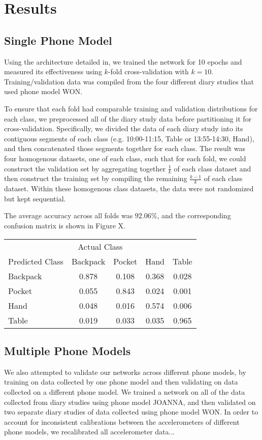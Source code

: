 \section{Results}
\subsection{Single Phone Model}
Using the architecture detailed in, we trained the network for 10 epochs
and measured its effectiveness using $k$-fold cross-validation with $k = 10$.
Training/validation data was compiled from the four different diary studies
that used phone model WON.

To ensure that each fold had comparable training and validation distributions 
for each class, we preprocessed all of the diary study data before partitioning it
for cross-validation. Specifically, we divided the data of each diary study into its 
contiguous segments of each class (e.g. 10:00-11:15, Table or 13:55-14:30, Hand),
and then concatenated those segments together for each class. The result was four 
homogenous datasets, one of each class, such that for each fold, we could construct
the validation set by aggregating together $\frac{1}{k}$ of each class dataset and then
construct the training set by compiling the remaining $\frac{k - 1}{k}$ of each class dataset.
Within these homogenous class datasets, the data were not randomized but 
kept sequential.

The average accuracy across all folds was $92.06\%$, and the corresponding
confusion matrix is shown in Figure X.

\begin{tabular}{| l || c | c | c | c |}  
\toprule
\multicolumn{5}{c}{Actual Class} \\ \cmidrule{2-5}
Predicted Class		&	Backpack    & 	Pocket 	& 	Hand	&	Table \\
\midrule
Backpack			&	0.878 	&	0.108	&	0.368 	&	0.028 \\
Pocket			&	0.055 	&	0.843 	&	0.024 	&	0.001 \\
Hand			&	0.048 	&	0.016 	&	0.574 	&	0.006 \\
Table			&	0.019 	&	0.033 	&	0.035 	&	0.965\\
\bottomrule
\end{tabular}

\subsection{Multiple Phone Models}
We also attempted to validate our networks across different phone models, by training
on data collected by one phone model and then validating on data collected on a 
different phone model. We trained a network on all of the 
data collected from diary studies using phone model JOANNA, and then validated on 
two separate diary studies of data collected using phone model WON. In order to account
for inconsistent calibrations between the accelerometers of different phone models, we
recalibrated all accelerometer data...

